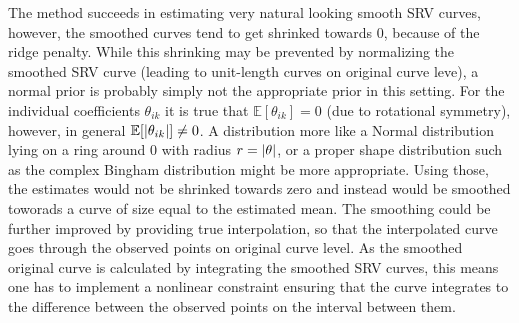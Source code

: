 The method succeeds in estimating very natural looking smooth SRV curves, however, the smoothed curves tend to get shrinked towards 0, because of the ridge penalty.
While this shrinking may be prevented by normalizing the smoothed SRV curve (leading to unit-length curves on original curve leve), a normal prior is probably simply not the appropriate prior in this setting.
For the individual coefficients $\theta_{ik}$ it is true that $\mathbb{E}[\theta_{ik}] = 0$ (due to rotational symmetry), however, in general $\mathbb{E}[\lvert\theta_{ik}\rvert] \neq 0$. 
A distribution more like a Normal distribution lying on a ring around 0 with radius $r = \lvert\theta\rvert$, or a proper shape distribution such as the complex Bingham distribution \parencite[see e.g.][Chap.\ 10]{DrydenMardia2016} might be more appropriate.
Using those, the estimates would not be shrinked towards zero and instead would be smoothed toworads a curve of size equal to the estimated mean.
The smoothing could be further improved by providing true interpolation, so that the interpolated curve goes through the observed points on original curve level.
As the smoothed original curve is calculated by integrating the smoothed SRV curves, this means one has to implement a nonlinear constraint ensuring that the curve integrates to the difference between the observed points on the interval between them.


